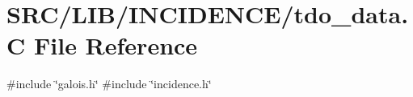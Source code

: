 \hypertarget{tdo__data_8_c}{}\section{S\+R\+C/\+L\+I\+B/\+I\+N\+C\+I\+D\+E\+N\+C\+E/tdo\+\_\+data.C File Reference}
\label{tdo__data_8_c}
{\ttfamily \#include \char`\"{}galois.\+h\char`\"{}}\newline
{\ttfamily \#include \char`\"{}incidence.\+h\char`\"{}}\newline
